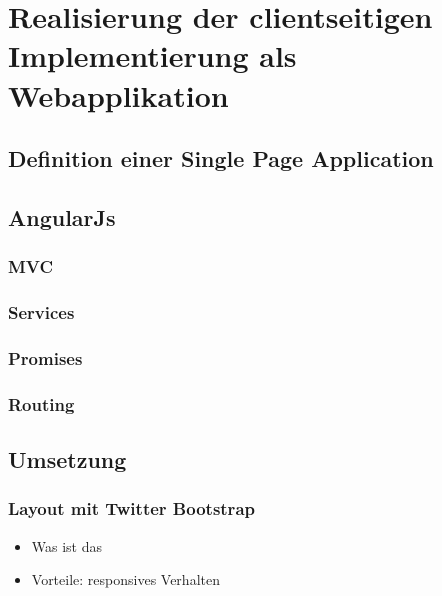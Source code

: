 \chapter{Realisierung der clientseitigen Implementierung als Webapplikation}
\label{cha:web-app}

\section{Definition einer Single Page Application}
\label{sec:Definition-SPA}

\section{AngularJs}
\label{sec:AngularJs}

\subsection{MVC}
\label{ssec:SPA-MVC}

\subsection{Services}
\label{ssec:SPA-Services}

\subsection{Promises}
\label{ssec:SPA-Promises}

\subsection{Routing}
\label{ssec:SPA-Routing}

\section{Umsetzung}
\label{sec:SPA-Umsetzung}

\subsection{Layout mit Twitter Bootstrap}
\label{ssec:SPA-twitter-bootstrap}

\begin{itemize}
\item Was ist das 
\item Vorteile: responsives Verhalten 
\end{itemize}

